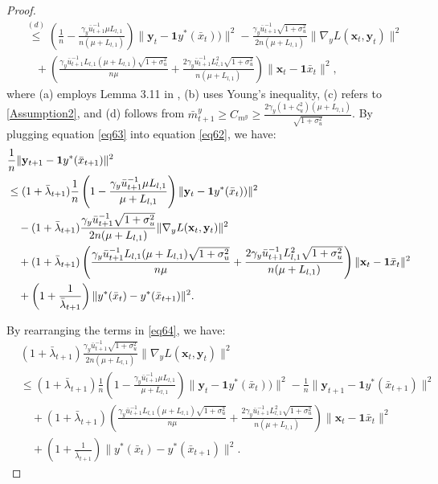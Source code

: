 \documentclass{article}
\theoremstyle{plain}
\theoremstyle{definition}
\theoremstyle{remark}
\begin{document}
\begin{proof}
\begin{align}
&\overset{(d)}{\leq} \left( \frac{1}{n} - \frac{\gamma_y\bar{u}^{-1}_{t+1} \mu L_{l,1}}{n(\mu + L_{l,1})} \right) \|\mathbf{y}_{t} - \mathbf{1}y^*(\bar{x}_t))\|^2  
- \frac{{\gamma_y\bar{u}^{-1}_{t+1}\sqrt{1+\sigma_u^2}}}{2n (\mu + L_{l,1})} \|\nabla_y L(\mathbf{x}_t, \mathbf{y}_t)\|^2 \nonumber\\
&\quad + \left(\frac{\gamma_y\bar{u}_{t+1}^{-1}L_{l,1}(\mu+L_{l,1})\sqrt{1+\sigma_u^2}}{n\mu }+\frac{2\gamma_y\bar{u}_{t+1}^{-1}L_{l,1}^2\sqrt{1+\sigma_u^2}}{n(\mu + L_{l,1})}\right) \|\mathbf{x}_t-\mathbf{1}\bar{x}_t\|^2,\label{eq63}
\end{align}
where (a) employs Lemma 3.11 in \citep{bubeck2015convex},
(b) uses Young's inequality, (c) refers to \cref{Assumption2}, and (d) follows from \(\bar{m}^y_{t+1} \geq C_{m^y} \geq \frac{2\gamma_y(1+\zeta_u^2)(\mu + L_{l,1})}{\sqrt{1+\sigma_u^2}}\).
By plugging equation \cref{eq63} into equation \cref{eq62}, we have:
\begin{align}
&\frac{1}{n}\|\mathbf{y}_{t+1} - \mathbf{1}y^*(\bar{x}_{t+1})\|^2 \nonumber\\
&\leq (1 + \bar{\lambda}_{t+1}) \frac{1}{n}\left( 1 - \frac{\gamma_y\bar{u}^{-1}_{t+1} \mu L_{l,1}}{\mu + L_{l,1}} \right) \|\mathbf{y}_{t} - \mathbf{1}y^*(\bar{x}_t))\|^2\notag\\
&\quad- (1 + \bar{\lambda}_{t+1})  \frac{{\gamma_y\bar{u}^{-1}_{t+1}\sqrt{1+\sigma_u^2}}}{2n (\mu + L_{l,1})}  \|\nabla_y L(\mathbf{x}_t, \mathbf{y}_t)\|^2\nonumber \\
&\quad +(1 + \bar{\lambda}_{t+1})  \left(\frac{\gamma_y\bar{u}_{t+1}^{-1}L_{l,1}(\mu+L_{l,1})\sqrt{1+\sigma_u^2}}{n\mu }+\frac{2\gamma_y\bar{u}_{t+1}^{-1}L_{l,1}^2\sqrt{1+\sigma_u^2}}{n(\mu + L_{l,1})}\right) \|\mathbf{x}_t-\mathbf{1}\bar{x}_t\|^2\nonumber\\
&\quad+ \left( 1 + \frac{1}{\bar{\lambda}_{t+1}} \right) \|y^*(\bar{x}_t) - y^*(\bar{x}_{t+1})\|^2. \label{eq64}
\end{align}

By rearranging the terms in \cref{eq64}, we have:
\begin{align}
&(1 + \bar{\lambda}_{t+1})  \frac{{\gamma_y\bar{u}^{-1}_{t+1}\sqrt{1+\sigma_u^2}}}{2n (\mu + L_{l,1})} \|\nabla_y L(\mathbf{x}_t, \mathbf{y}_t)\|^2\nonumber\\
&\leq (1 + \bar{\lambda}_{t+1}) \frac{1}{n}\left( 1 - \frac{\gamma_y\bar{u}^{-1}_{t+1} \mu L_{l,1}}{\mu + L_{l,1}} \right) \|\mathbf{y}_{t} - \mathbf{1}y^*(\bar{x}_t))\|^2
- \frac{1}{n}\|\mathbf{y}_{t+1} - \mathbf{1}y^*(\bar{x}_{t+1})\|^2 \nonumber \\
&\quad +(1 + \bar{\lambda}_{t+1})  \left(\frac{\gamma_y\bar{u}_{t+1}^{-1}L_{l,1}(\mu+L_{l,1})\sqrt{1+\sigma_u^2}}{n\mu }+\frac{2\gamma_y\bar{u}_{t+1}^{-1}L_{l,1}^2\sqrt{1+\sigma_u^2}}{n(\mu + L_{l,1})}\right) \|\mathbf{x}_t-\mathbf{1}\bar{x}_t\|^2\nonumber\\
&\quad+ \left( 1 + \frac{1}{\bar{\lambda}_{t+1}} \right) \|y^*(\bar{x}_t) - y^*(\bar{x}_{t+1})\|^2.\label{eq65}
\end{align}


\end{proof}
\end{document}
